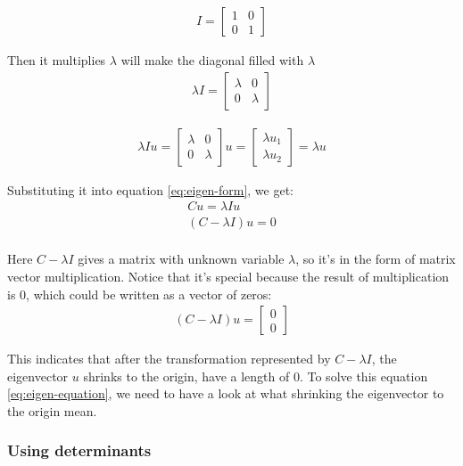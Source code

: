\documentclass[stu,12pt,floatsintext]{apa7}
\begin{document}
\begin{gather}
    I=\begin{bmatrix}
        1 & 0\\
        0 & 1
    \end{bmatrix}
\end{gather}

Then it multiplies $\lambda$ will make the diagonal filled with $\lambda$
\begin{gather}
    \lambda I=\begin{bmatrix}
        \lambda & 0\\
        0 & \lambda
    \end{bmatrix}
\end{gather}

\begin{gather}
    \lambda Iu=\begin{bmatrix}
        \lambda & 0\\
        0 & \lambda
    \end{bmatrix} u=\begin{bmatrix}
        \lambda u_1\\
        \lambda u_2
    \end{bmatrix}=\lambda u
\end{gather}

Substituting it into equation \ref{eq:eigen-form}, we get:
\begin{gather}
    Cu=\lambda Iu\\
    (C-\lambda I) u=0\\
\end{gather}

Here $C-\lambda I$ gives a matrix with unknown variable $\lambda$, so it's in the form of matrix vector multiplication. Notice that it's special because the result of multiplication is $0$, which could be written as a vector of zeros:
\begin{gather}
    \label{eq:eigen-equation}
    (C-\lambda I)u=\begin{bmatrix}
        0\\0
    \end{bmatrix}
\end{gather}

This indicates that after the transformation represented by $C-\lambda I$, the eigenvector $u$ shrinks to the origin, have a length of $0$. To solve this equation \ref{eq:eigen-equation}, we need to have a look at what shrinking the eigenvector to the origin mean. 

\subsubsection{Using determinants}
\label{sec:using-determinants}
\end{document}
